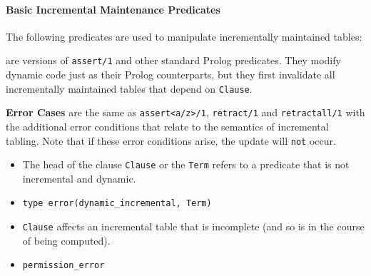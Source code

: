 \begin{description}
\end{description}

\paragraph{Basic Incremental Maintenance Predicates}
The following predicates are used to manipulate incrementally
maintained tables:

\begin{description}
% 
are versions of {\tt assert/1} and other standard Prolog predicates.
They modify dynamic code just as their Prolog counterparts, but they
first invalidate all incrementally maintained tables that depend on
{\tt Clause}.

{\bf Error Cases} are the same as {\tt assert<a/z>/1}, {\tt retract/1}
and {\tt retractall/1} with the additional error conditions that
relate to the semantics of incremental tabling.  Note that if these
error conditions arise, the update will {\tt not} occur.

\begin{itemize}
\item The head of the clause {\tt Clause} or the {\tt Term} refers to
  a predicate that is not incremental and dynamic.  
\bi
\item  {\tt type error(dynamic\_incremental, Term)}
\ei
%
\item {\tt Clause} affects an incremental table that is incomplete
  (and so is in the course of being computed).
\bi
\item  {\tt permission\_error}
\ei 
\end{itemize}



\end{description}
